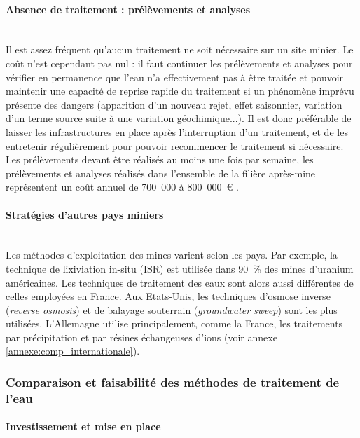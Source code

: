 \documentclass{article}
\begin{document}
\paragraph{Absence de traitement : prélèvements et analyses \\ \\}

Il est assez fréquent qu’aucun traitement ne soit nécessaire sur un site minier. Le coût n’est cependant pas nul : il faut continuer les prélèvements et analyses pour vérifier en permanence que l’eau n’a effectivement pas à être traitée et pouvoir maintenir une capacité de reprise rapide du traitement si un phénomène imprévu présente des dangers (apparition d’un nouveau rejet, effet saisonnier, variation d'un terme source suite à une variation géochimique...). Il est donc préférable de laisser les infrastructures en place après l'interruption d’un traitement, et de les entretenir régulièrement pour pouvoir recommencer le traitement si nécessaire. Les prélèvements devant être réalisés au moins une fois par semaine, les prélèvements et analyses réalisés dans l’ensemble de la filière après-mine représentent un coût annuel de 700~000 à 800~000~\euro{} \cite{schick_informations_2020}.

\paragraph{Stratégies d'autres pays miniers \\ \\} Les méthodes d'exploitation des mines varient selon les pays. Par exemple, la technique de lixiviation in-situ (ISR) est utilisée dans 90~\% des mines d'uranium américaines. Les techniques de traitement des eaux sont alors aussi différentes de celles employées en France. Aux Etats-Unis, les techniques d'osmose inverse (\textit{reverse osmosis}) et de balayage souterrain (\textit{groundwater sweep}) sont les plus utilisées. L'Allemagne utilise principalement, comme la France, les traitements par précipitation et par résines échangeuses d'ions \cite{noauthor_wismut_nodate}\cite{noauthor_decommissioning_nodate} (voir annexe \ref{annexe:comp_internationale}).

\subsubsection{Comparaison et faisabilité des méthodes de traitement de l'eau}
\paragraph{Investissement et mise en place \\ \\}
\end{document}
